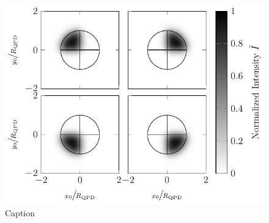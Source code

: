 \lipsum[1-2]

\begin{figure}[htp]
  \centering
  \includegraphics[]{Plots/cache/V_quadrant.pdf}
  \caption{Caption}
  \label{fig:Th-quadrant_Intensity}
\end{figure}


